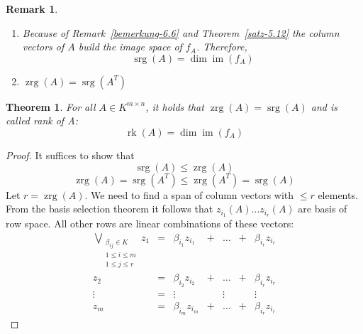 \documentclass[a4paper,landscape,twocolumn]{article}
\newtheorem{theorem}{Theorem}[section]
\newtheorem{rem}{Remark}[section]
\DeclareMathOperator\image{im} %
\begin{document}
%
\begin{rem}
  \begin{enumerate}
    \item Because of Remark~\ref{bemerkung-6.6} and Theorem~\ref{satz-5.12}
      the column vectors of $A$ build the image space of $f_A$.
      Therefore,
      \[ \operatorname{srg}(A) = \dim \image(f_A) \]
    \item $\operatorname{zrg}(A) = \operatorname{srg}(A^T)$
  \end{enumerate}
\end{rem}
%
\begin{theorem}
  For all $A \in K^{m \times n}$, it holds that $\operatorname{zrg}(A) = \operatorname{srg}(A)$
  and is called \emph{rank} of A:
  \[ \operatorname{rk}(A) = \dim{\image(f_A)} \]
\end{theorem}
\begin{proof}
  It suffices to show that
  \[ \operatorname{srg}(A) \leq \operatorname{zrg}(A) \]
  \[ \operatorname{zrg}(A) = \operatorname{srg}(A^T) \leq \operatorname{zrg}(A^T) = \operatorname{srg}(A) \]
  Let $r = \operatorname{zrg}(A)$.
  We need to find a span of column vectors with $\leq r$ elements.
  From the basis selection theorem it follows that
  $z_{i_1}(A) \ldots z_{i_r}(A)$ are basis of row space.
  All other rows are linear combinations of these vectors:
  \[
    \begin{array}{ccccccc}
      \bigvee_{\substack{\beta_{ij} \in K \\ 1 \leq i \leq m \\ 1 \leq j \leq r}}
        z_1 &=& \beta_{i_1} z_{i_1} &+& \ldots &+& \beta_{i_r} z_{i_r} \\
        z_2 &=& \beta_{i_2} z_{i_2} &+& \ldots &+& \beta_{i_r} z_{i_r} \\
     \vdots &=& \vdots              & & \vdots & & \vdots \\
        z_m &=& \beta_{i_m} z_{i_m} &+& \ldots &+& \beta_{i_r} z_{i_r}
    \end{array}
  \]


\end{proof}
\end{document}
